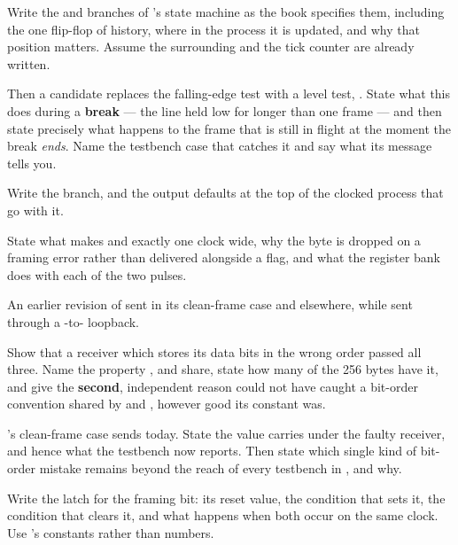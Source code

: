  Write the  and  branches of 's state
machine as the book specifies them, including the one flip-flop of history, where in the process it
is updated, and why that position matters. Assume the surrounding  and the
tick counter are already written.

Then a candidate replaces the falling-edge test with a level test, . State
what this does during a \textbf{break} --- the line held low for longer than one frame --- and then
state precisely what happens to the frame that is still in flight at the moment the break
\emph{ends}. Name the testbench case that catches it and say what its message tells you. 

 Write the  branch, and the output defaults at the top of the clocked
process that go with it.

State what makes  and  exactly one clock wide, why the byte is dropped
on a framing error rather than delivered alongside a flag, and what the register bank does with each
of the two pulses. 

 An earlier revision of  sent  in its clean-frame case and
 elsewhere, while  sent  through a -to-
loopback.

Show that a receiver which stores its data bits in the wrong order passed all three. Name the
property ,  and  share, state how many of the 256 bytes have it,
and give the \textbf{second}, independent reason  could not have caught a
bit-order convention shared by  and , however good its constant was.

's clean-frame case sends  today. State the value 
carries under the faulty receiver, and hence what the testbench now reports. Then state which single
kind of bit-order mistake remains beyond the reach of every testbench in , and why.

\label{exb:q:4}

 Write the  latch for the framing bit: its reset value, the condition
that sets it, the condition that clears it, and what happens when both occur on the same clock. Use
's constants rather than numbers.

